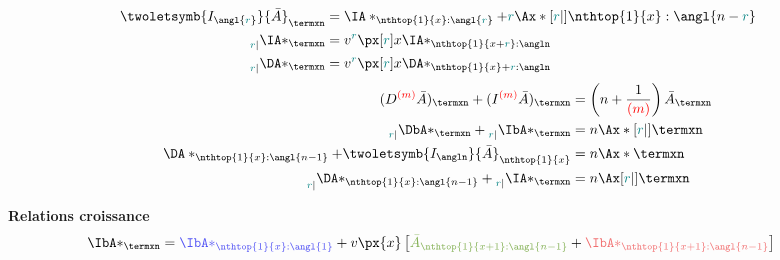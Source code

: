 \documentclass[10pt, french]{article}
\begin{document}
\begin{multicols*}{3}
\begin{align*}
	\twoletsymb{I_{\angl{\textcolor{teal}{r}}}}{\bar{A}}_{\termxn} 
	&=	\IA*_{\nthtop{1}{x}:\angl{\textcolor{teal}{r}}} + \textcolor{teal}{r} \Ax*[\textcolor{teal}{r}|]{\nthtop{1}{x}:\angl{n-\textcolor{teal}{r}}}\\
	{\prescript{}{\textcolor{teal}{r}|}{\IA*_{\termxn}}} 
	&=	v^{\textcolor{teal}{r}} \px[\textcolor{teal}{r}]{x} {\IA*_{\nthtop{1}{x + \textcolor{teal}{r}}:\angln}}\\
	{\prescript{}{\textcolor{teal}{r}|}{\DA*_{\termxn}}}
	&=	v^{\textcolor{teal}{r}}\px[\textcolor{teal}{r}]{x}\DA*_{\nthtop{1}{x} + \textcolor{teal}{r}:\angln}\\
\end{align*}
\begin{align*}
	{(D^{\color{red}{(m)}}\bar{A})_{\termxn}} + (I^{\color{red}{(m)}}\bar{A})_{\termxn} 
	&=	\left(n + \frac{1}{{\color{red}{(m)}}} \right) \bar{A}_{\termxn}\\
	{\prescript{}{\textcolor{teal}{r}|}{\DbA*_{\termxn}}} + \prescript{}{\textcolor{teal}{r}|}{\IbA*_{\termxn}}  
	&=	n \Ax*[\textcolor{teal}{r}|]{\termxn}\\	
	\DA*_{\nthtop{1}{x}:\angl{n-1}} + \twoletsymb{I_{\angln}}{\bar{A}}_{\nthtop{1}{x}} 
	&=	n \Ax*{\termxn}\\		
	{\prescript{}{\textcolor{teal}{r}|}{\DA*_{\nthtop{1}{x}:\angl{n-1}}}} + \prescript{}{\textcolor{teal}{r}|}{\IA*_{\termxn}}  
	&=	n \Ax[\textcolor{teal}{r}|]{\termxn}\\	
\end{align*}

\textbf{Relations croissance}
\begin{align*}
	\IbA*_{\termxn} 
	&=	{\color{blue_rectangle}{\IbA*_{\nthtop{1}{x}:\angl{1}}}} + v \px{x} \left[ {\color{green_rectangle}{\bar{A}_{\nthtop{1}{x + 1}:\angl{n - 1}}}} + {\color{red_rectangle}{\IbA*_{\nthtop{1}{x + 1}:\angl{n - 1}}}} \right]
\end{align*}

\begin{tikzpicture}[x=0.75pt,y=0.75pt,yscale=-1,xscale=1]


\end{tikzpicture}
\end{multicols*}
\end{document}
